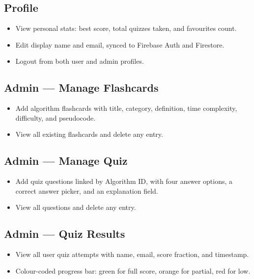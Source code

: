 \documentclass[12pt,a4paper]{article}
\begin{document}
\subsection*{Profile}

\begin{itemize}[leftmargin=1.5em, itemsep=3pt]
  \item View personal stats: best score, total quizzes taken, and favourites count.
  \item Edit display name and email, synced to Firebase Auth and Firestore.
  \item Logout from both user and admin profiles.
\end{itemize}

\subsection*{Admin --- Manage Flashcards}

\begin{itemize}[leftmargin=1.5em, itemsep=3pt]
  \item Add algorithm flashcards with title, category, definition, time complexity,
        difficulty, and pseudocode.
  \item View all existing flashcards and delete any entry.
\end{itemize}

\subsection*{Admin --- Manage Quiz}

\begin{itemize}[leftmargin=1.5em, itemsep=3pt]
  \item Add quiz questions linked by Algorithm ID, with four answer options,
        a correct answer picker, and an explanation field.
  \item View all questions and delete any entry.
\end{itemize}

\subsection*{Admin --- Quiz Results}

\begin{itemize}[leftmargin=1.5em, itemsep=3pt]
  \item View all user quiz attempts with name, email, score fraction, and timestamp.
  \item Colour-coded progress bar: green for full score, orange for partial, red for low.
\end{itemize}
\end{document}
